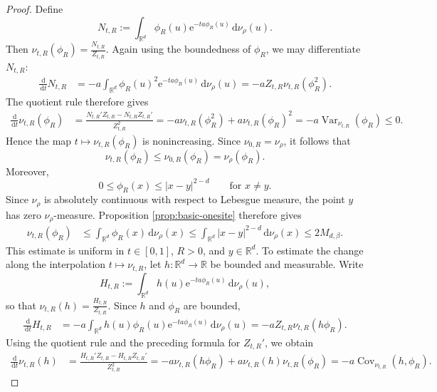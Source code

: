 \documentclass[12pt,reqno,letterpaper]{amsart}
\theoremstyle{definition}
\theoremstyle{remark}
\numberwithin{equation}{section}
\newcommand{\R}{\mathbb R}
\newcommand{\dd}{\,\mathrm d}
\newcommand{\ee}{\mathrm e}
\newcommand{\be}{\beta}
\newcommand{\Var}{\operatorname{Var}}
\begin{document}
\begin{proof}
Define
\[
 N_{t,R}
 :=
 \int_{\R^d}\phi_R(u)\ee^{-ta\phi_R(u)}
 \dd\nu_\rho(u).
\]
Then $\nu_{t,R}(\phi_R)=\frac{N_{t,R}}{Z_{t,R}}.$ Again using the boundedness of \(\phi_R\), we may differentiate \(N_{t,R}\):
\begin{align*}
 \frac{\dd}{\dd t}N_{t,R}
 &=
 -a\int_{\R^d}\phi_R(u)^2\ee^{-ta\phi_R(u)}
 \dd\nu_\rho(u)=
 -aZ_{t,R}\nu_{t,R}(\phi_R^2).
\end{align*}
The quotient rule therefore gives
\begin{align*}
 \frac{\dd}{\dd t}\nu_{t,R}(\phi_R)
 &=
 \frac{N_{t,R}'Z_{t,R}-N_{t,R}Z_{t,R}'}
      {Z_{t,R}^2}=
 -a\nu_{t,R}(\phi_R^2)
 +a\nu_{t,R}(\phi_R)^2=
 -a\Var_{\nu_{t,R}}(\phi_R)
 \le0.
\end{align*}
Hence the map \(t\mapsto\nu_{t,R}(\phi_R)\) is nonincreasing.  Since
\(\nu_{0,R}=\nu_\rho\), it follows that
\[
 \nu_{t,R}(\phi_R)
 \le\nu_{0,R}(\phi_R)
 =\nu_\rho(\phi_R).
\]
Moreover,
\[
 0\le\phi_R(x)\le |x-y|^{2-d}
 \qquad\text{for }x\ne y.
\]
Since \(\nu_\rho\) is absolutely continuous with respect to Lebesgue
measure, the point \(y\) has zero \(\nu_\rho\)-measure.  Proposition
\ref{prop:basic-onesite} therefore gives
\begin{align*}
 \nu_{t,R}(\phi_R)
 &\le
 \int_{\R^d}\phi_R(x)\dd\nu_\rho(x)\le
 \int_{\R^d}|x-y|^{2-d}\dd\nu_\rho(x)\le 2M_{d,\be}.
\end{align*}
This estimate is uniform in \(t\in[0,1]\), \(R>0\), and \(y\in\R^d\). To estimate the change along the interpolation
\(t\mapsto\nu_{t,R}\), let \(h:\R^d\to\R\) be bounded and measurable.
Write
\[
 H_{t,R}
 :=
 \int_{\R^d}h(u)\ee^{-ta\phi_R(u)}\dd\nu_\rho(u),
\]
so that $\nu_{t,R}(h)=\frac{H_{t,R}}{Z_{t,R}}.$
Since \(h\) and \(\phi_R\) are bounded,
\begin{align*}
 \frac{\dd}{\dd t}H_{t,R}
 &=
 -a\int_{\R^d}h(u)\phi_R(u)
 \ee^{-ta\phi_R(u)}\dd\nu_\rho(u)=
 -aZ_{t,R}\nu_{t,R}(h\phi_R).
\end{align*}
Using the quotient rule and the preceding formula for \(Z_{t,R}'\), we
obtain
\begin{align*}
 \frac{\dd}{\dd t}\nu_{t,R}(h)
 &=
 \frac{H_{t,R}'Z_{t,R}-H_{t,R}Z_{t,R}'}
      {Z_{t,R}^2}=
 -a\nu_{t,R}(h\phi_R)
 +a\nu_{t,R}(h)\nu_{t,R}(\phi_R)=
 -a\operatorname{Cov}_{\nu_{t,R}}(h,\phi_R).
\end{align*}


\end{proof}
\end{document}
